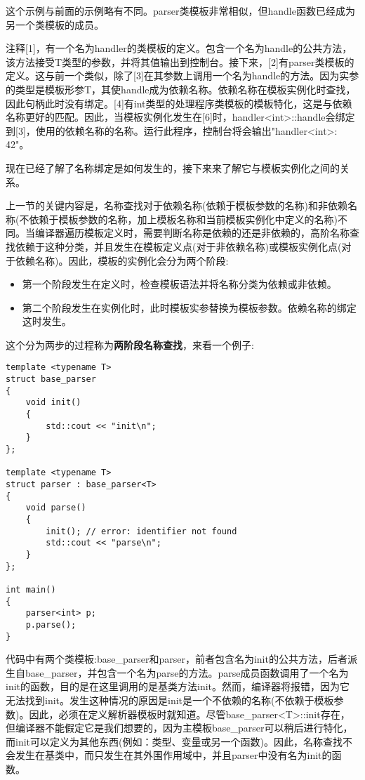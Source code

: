 这个示例与前面的示例略有不同。parser类模板非常相似，但handle函数已经成为另一个类模板的成员。

注释[1]，有一个名为handler的类模板的定义。包含一个名为handle的公共方法，该方法接受T类型的参数，并将其值输出到控制台。接下来，[2]有parser类模板的定义。这与前一个类似，除了[3]在其参数上调用一个名为handle的方法。因为实参的类型是模板形参T，其使handle成为依赖名称。依赖名称在模板实例化时查找，因此句柄此时没有绑定。[4]有int类型的处理程序类模板的模板特化，这是与依赖名称更好的匹配。因此，当模板实例化发生在[6]时，handler<int>::handle会绑定到[3]，使用的依赖名称的名称。运行此程序，控制台将会输出"handler<int>: 42"。

现在已经了解了名称绑定是如何发生的，接下来来了解它与模板实例化之间的关系。


上一节的关键内容是，名称查找对于依赖名称(依赖于模板参数的名称)和非依赖名称(不依赖于模板参数的名称，加上模板名称和当前模板实例化中定义的名称)不同。当编译器遍历模板定义时，需要判断名称是依赖的还是非依赖的，高阶名称查找依赖于这种分类，并且发生在模板定义点(对于非依赖名称)或模板实例化点(对于依赖名称)。因此，模板的实例化会分为两个阶段:

\begin{itemize}
\item
第一个阶段发生在定义时，检查模板语法并将名称分类为依赖或非依赖。

\item
第二个阶段发生在实例化时，此时模板实参替换为模板参数。依赖名称的绑定这时发生。
\end{itemize}

这个分为两步的过程称为\textbf{两阶段名称查找}，来看一个例子:

\begin{lstlisting}[style=styleCXX]
template <typename T>
struct base_parser
{
	void init()
	{
		std::cout << "init\n";
	}
};

template <typename T>
struct parser : base_parser<T>
{
	void parse()
	{
		init(); // error: identifier not found
		std::cout << "parse\n";
	}
};

int main()
{
	parser<int> p;
	p.parse();
}
\end{lstlisting}

代码中有两个类模板:base\_parser和parser，前者包含名为init的公共方法，后者派生自base\_parser，并包含一个名为parse的方法。parse成员函数调用了一个名为init的函数，目的是在这里调用的是基类方法init。然而，编译器将报错，因为它无法找到init。发生这种情况的原因是init是一个不依赖的名称(不依赖于模板参数)。因此，必须在定义解析器模板时就知道。尽管base\_parser<T>::init存在，但编译器不能假定它是我们想要的，因为主模板base\_parser可以稍后进行特化，而init可以定义为其他东西(例如：类型、变量或另一个函数)。因此，名称查找不会发生在基类中，而只发生在其外围作用域中，并且parser中没有名为init的函数。

